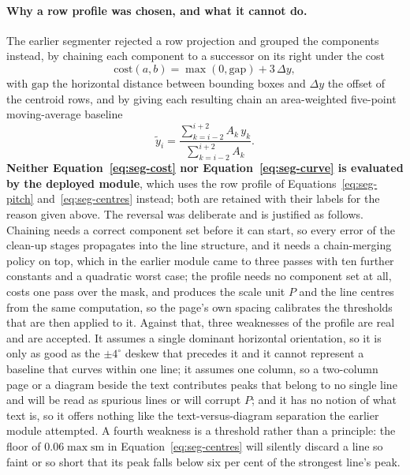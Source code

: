\paragraph{Why a row profile was chosen, and what it cannot do.}
The earlier segmenter rejected a row projection and grouped the components instead, by chaining each component to a successor on its right under the cost
\begin{equation}
\mathrm{cost}(a,b)=\max(0,\mathrm{gap})+3\,\Delta y,
\label{eq:seg-cost}
\end{equation}
with $\mathrm{gap}$ the horizontal distance between bounding boxes and $\Delta y$ the offset of the centroid rows, and by giving each resulting chain an area-weighted five-point moving-average baseline
\begin{equation}
\tilde y_i=\frac{\sum_{k=i-2}^{i+2}A_k\,y_k}{\sum_{k=i-2}^{i+2}A_k}.
\label{eq:seg-curve}
\end{equation}
\textbf{Neither Equation~\ref{eq:seg-cost} nor Equation~\ref{eq:seg-curve} is evaluated by the deployed module}, which uses the row profile of Equations~\ref{eq:seg-pitch} and~\ref{eq:seg-centres} instead; both are retained with their labels for the reason given above.
The reversal was deliberate and is justified as follows.
Chaining needs a correct component set before it can start, so every error of the clean-up stages propagates into the line structure, and it needs a chain-merging policy on top, which in the earlier module came to three passes with ten further constants and a quadratic worst case; the profile needs no component set at all, costs one pass over the mask, and produces the scale unit $P$ and the line centres from the same computation, so the page's own spacing calibrates the thresholds that are then applied to it.
Against that, three weaknesses of the profile are real and are accepted.
It assumes a single dominant horizontal orientation, so it is only as good as the $\pm4^\circ$ deskew that precedes it and it cannot represent a baseline that curves within one line; it assumes one column, so a two-column page or a diagram beside the text contributes peaks that belong to no single line and will be read as spurious lines or will corrupt $P$; and it has no notion of what text is, so it offers nothing like the text-versus-diagram separation the earlier module attempted.
A fourth weakness is a threshold rather than a principle: the floor of $0.06\max\mathrm{sm}$ in Equation~\ref{eq:seg-centres} will silently discard a line so faint or so short that its peak falls below six per cent of the strongest line's peak.
